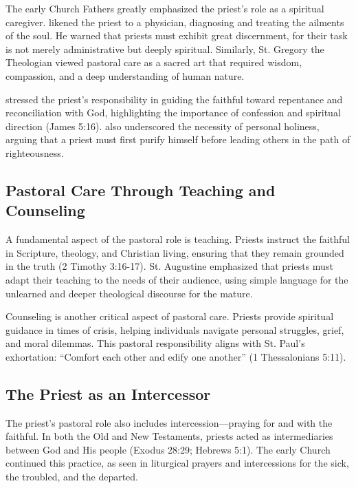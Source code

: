 \documentclass[12pt, doc]{apa7}   	%
\begin{document}
The early Church Fathers greatly emphasized the priest’s role as a spiritual caregiver. \citet{priesthood_chrysostom,complete_work_chrysostom} likened the priest to a physician, diagnosing and treating the ailments of the soul. He warned that priests must exhibit great discernment, for their task is not merely administrative but deeply spiritual. Similarly, St. Gregory the Theologian \citep{early_church_akin} viewed pastoral care as a sacred art that required wisdom, compassion, and a deep understanding of human nature.

\citet{priesthood_shenouda} stressed the priest’s responsibility in guiding the faithful toward repentance and reconciliation with God, highlighting the importance of confession and spiritual direction (James 5:16). \citet{st_basil_letters} also underscored the necessity of personal holiness, arguing that a priest must first purify himself before leading others in the path of righteousness.

\subsection{Pastoral Care Through Teaching and Counseling}

A fundamental aspect of the pastoral role is teaching. Priests instruct the faithful in Scripture, theology, and Christian living, ensuring that they remain grounded in the truth (2 Timothy 3:16-17). St. Augustine \citep{early_church_akin} emphasized that priests must adapt their teaching to the needs of their audience, using simple language for the unlearned and deeper theological discourse for the mature.

Counseling is another critical aspect of pastoral care. Priests provide spiritual guidance in times of crisis, helping individuals navigate personal struggles, grief, and moral dilemmas. This pastoral responsibility aligns with St. Paul’s exhortation: ``Comfort each other and edify one another'' (1 Thessalonians 5:11).

\subsection{The Priest as an Intercessor}

The priest’s pastoral role also includes intercession—praying for and with the faithful. In both the Old and New Testaments, priests acted as intermediaries between God and His people (Exodus 28:29; Hebrews 5:1). The early Church continued this practice, as seen in liturgical prayers and intercessions for the sick, the troubled, and the departed.
\end{document}
